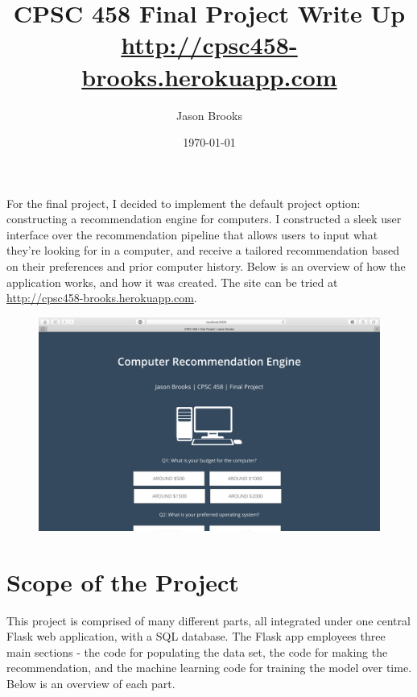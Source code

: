 \documentclass[10pt,letter]{article}
\begin{document}


\title{CPSC 458 Final Project Write Up \\ \url{http://cpsc458-brooks.herokuapp.com}}
\date{\today}

\author{Jason Brooks}

\maketitle 

For the final project, I decided to implement the default project option: constructing a recommendation engine for computers. I constructed a sleek user interface over the recommendation pipeline that allows users to input what they're looking for in a computer, and receive a tailored recommendation based on their preferences and prior computer history. Below is an overview of how the application works, and how it was created. The site can be tried at \url{http://cpsc458-brooks.herokuapp.com}.

 \begin{figure}[htbp]
    \centering
    \includegraphics[width=7.0in]{homepage.png}
\end{figure}

\section{Scope of the Project}
This project is comprised of many different parts, all integrated under one central Flask web application, with a SQL database. The Flask app employees three main sections - the code for populating the data set, the code for making the recommendation, and the machine learning code for training the model over time. Below is an overview of each part.
\end{document}
